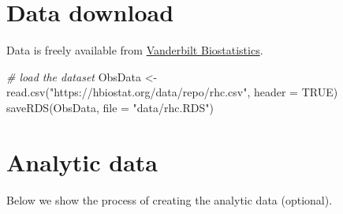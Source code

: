 \documentclass[
]{book}
\newenvironment{Shaded}{\begin{snugshade}}{\end{snugshade}}
\newcommand{\AttributeTok}[1]{\textcolor[rgb]{0.77,0.63,0.00}{#1}}
\newcommand{\CommentTok}[1]{\textcolor[rgb]{0.56,0.35,0.01}{\textit{#1}}}
\newcommand{\ConstantTok}[1]{\textcolor[rgb]{0.00,0.00,0.00}{#1}}
\newcommand{\FunctionTok}[1]{\textcolor[rgb]{0.00,0.00,0.00}{#1}}
\newcommand{\NormalTok}[1]{#1}
\newcommand{\OtherTok}[1]{\textcolor[rgb]{0.56,0.35,0.01}{#1}}
\newcommand{\StringTok}[1]{\textcolor[rgb]{0.31,0.60,0.02}{#1}}
\begin{document}
\hypertarget{data-download}{%
\section{Data download}\label{data-download}}

\begin{rmdcomment}
Data is freely available from
\href{https://hbiostat.org/data/}{Vanderbilt Biostatistics}.
\end{rmdcomment}

\begin{Shaded}
\begin{Highlighting}[]
\CommentTok{\# load the dataset}
\NormalTok{ObsData }\OtherTok{\textless{}{-}} \FunctionTok{read.csv}\NormalTok{(}\StringTok{"https://hbiostat.org/data/repo/rhc.csv"}\NormalTok{, }\AttributeTok{header =} \ConstantTok{TRUE}\NormalTok{)}
\FunctionTok{saveRDS}\NormalTok{(ObsData, }\AttributeTok{file =} \StringTok{"data/rhc.RDS"}\NormalTok{)}
\end{Highlighting}
\end{Shaded}

\hypertarget{analytic-data}{%
\section{Analytic data}\label{analytic-data}}

Below we show the process of creating the analytic data (optional).
\end{document}
